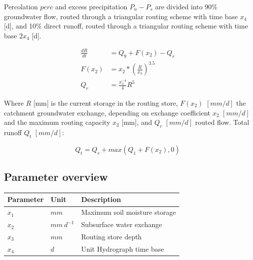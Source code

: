 Percolation $perc$ and excess precipitation $P_n - P_s$ are divided into 90\% groundwater flow, routed through a triangular routing scheme with time base $x_4$ [d], and 10\% direct runoff, routed through a triangular routing scheme with time base $2x_4$ [d].

\begin{align}
	\frac{dR}{dt} &= Q_{9} + F(x_2) -Q_r\\
	F(x_2) &= x_2*\left(\frac{R}{x_3}\right)^{3.5} \\	
	Q_r &= \frac{x_3^{-4}}{4}R^5
\end{align}

Where $R$ [mm] is the current storage in the routing store, $F(x_2)$ $[mm/d]$ the catchment groundwater exchange, depending on exchange coefficient $x_2$ $[mm/d]$ and the maximum routing capacity $x_3$ [mm], and $Q_r$ $[mm/d]$ routed flow. Total runoff $Q_t$ $[mm/d]$: 

\begin{equation}
	Q_t = Q_r + max(Q_1+F(x_2),0)
\end{equation} 

\subsection{Parameter overview}
\begin{table}[htbp]
  \centering
    \begin{tabular}{lll}
    \toprule
    Parameter & Unit  & Description \\
    \midrule
    $x_1$ & $mm$  & Maximum soil moisture storage \\
    $x_2$ & $mm~d^{-1}$ & Subsurface water exchange \\
    $x_3$ & $mm$  & Routing store depth \\
    $x_4$ & $d$   & Unit Hydrograph time base \\
    \bottomrule
    \end{tabular}%
  \label{tab:addlabel}%
\end{table}%

